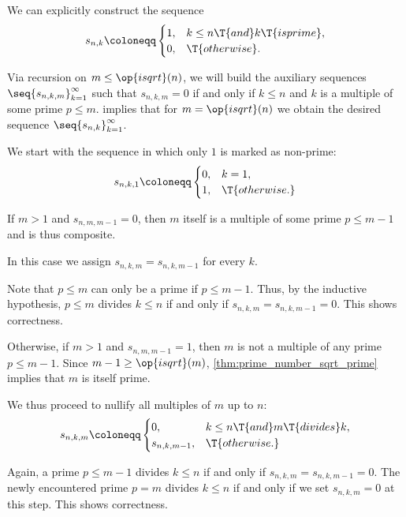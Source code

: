 \begin{algorithm}\label{alg:sieve_of_eratosthenes}
  We can explicitly construct the sequence
  \begin{equation*}
    s_{n,k} \coloneqq \begin{cases}
      1, &k \leq n \T{and} k \T{is prime}, \\
      0, &\T{otherwise}.
    \end{cases}
  \end{equation*}

  Via recursion on \( m \leq \op{isqrt}(n) \), we will build the auxiliary sequences \( \seq{ s_{n,k,m} }_{k=1}^\infty \) such that \( s_{n,k,m} = 0 \) if and only if \( k \leq n \) and \( k \) is a multiple of some prime \( p \leq m \).  implies that for \( m = \op{isqrt}(n) \) we obtain the desired sequence \( \seq{ s_{n,k} }_{k=1}^\infty \).

  \begin{thmenum}
     We start with the sequence in which only \( 1 \) is marked as non-prime:
    \begin{equation*}
      s_{n,k,1} \coloneqq \begin{cases}
        0, &k = 1, \\
        1, &\T{otherwise.}
      \end{cases}
    \end{equation*}

     If \( m > 1 \) and \( s_{n,m,m-1} = 0 \), then \( m \) itself is a multiple of some prime \( p \leq m - 1 \) and is thus composite.

    In this case we assign \( s_{n,k,m} = s_{n,k,m-1} \) for every \( k \).

    Note that \( p \leq m \) can only be a prime if \( p \leq m - 1 \). Thus, by the inductive hypothesis, \( p \leq m \) divides \( k \leq n \) if and only if \( s_{n,k,m} = s_{n,k,m-1} = 0 \). This shows correctness.

     Otherwise, if \( m > 1 \) and \( s_{n,m,m-1} = 1 \), then \( m \) is not a multiple of any prime \( p \leq m - 1 \). Since \( m - 1 \geq \op{isqrt}(m) \), \cref{thm:prime_number_sqrt_prime} implies that \( m \) is itself prime.

    We thus proceed to nullify all multiples of \( m \) up to \( n \):
    \begin{equation*}
      s_{n,k,m} \coloneqq \begin{cases}
        0,           &k \leq n \T{and} m \T{divides} k, \\
        s_{n,k,m-1}, &\T{otherwise.}
      \end{cases}
    \end{equation*}

    Again, a prime \( p \leq m - 1 \) divides \( k \leq n \) if and only if \( s_{n,k,m} = s_{n,k,m-1} = 0 \). The newly encountered prime \( p = m \) divides \( k \leq n \) if and only if we set \( s_{n,k,m} = 0 \) at this step. This shows correctness.
  \end{thmenum}
\end{algorithm}
